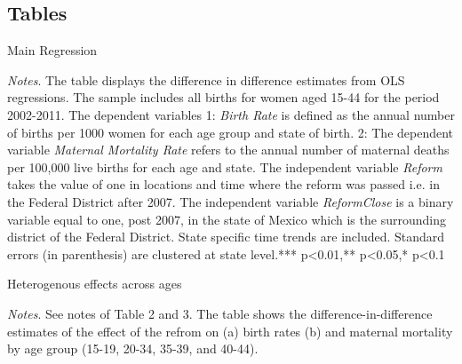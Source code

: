 \documentclass[a4paper, 11pt]{article}
\begin{document}
\begin{spacing}{1.5}


\section*{Tables}
\begin{table}[htpb!]\caption{Main Regression}\label{reg1}
\begin{threeparttable}
	  
	\begin{tablenotes}
		\footnotesize
		\item \textit{Notes}.  The table displays the difference in difference estimates from OLS regressions. The sample includes all births for women aged 15-44 for the period 2002-2011. The dependent variables 1: \textit{Birth Rate} is defined as the annual number of births per 1000 women for each age group and state of birth. 2: The dependent variable \textit{Maternal Mortality Rate} refers to the annual number of maternal deaths per 100,000 live births for each age and state. The independent variable \textit{Reform} takes the value of one in locations and time where the reform was passed i.e. in the Federal District after 2007. The independent variable \textit{ReformClose} is a binary variable equal to one, post 2007, in the state of Mexico which is the surrounding district of the Federal District. State specific time trends are included. Standard errors (in parenthesis) are clustered at state level.*** p<0.01,** p<0.05,* p<0.1
	\end{tablenotes} 
\end{threeparttable}
\end{table}
 
 
 
\begin{table}[htpb!]\caption{Heterogenous effects across ages} \label{heteromed}
	\begin{threeparttable}
		
		{\small  }
		\begin{tablenotes}
			\footnotesize
			\item \textit{Notes}.  See notes of Table 2 and 3. The table shows the difference-in-difference estimates of the effect of the refrom on (a) birth rates (b) and maternal mortality by age group (15-19, 20-34, 35-39, and 40-44).
		\end{tablenotes} 
	\end{threeparttable}
\end{table}


 	
 	 

 


\end{spacing}
\end{document}
